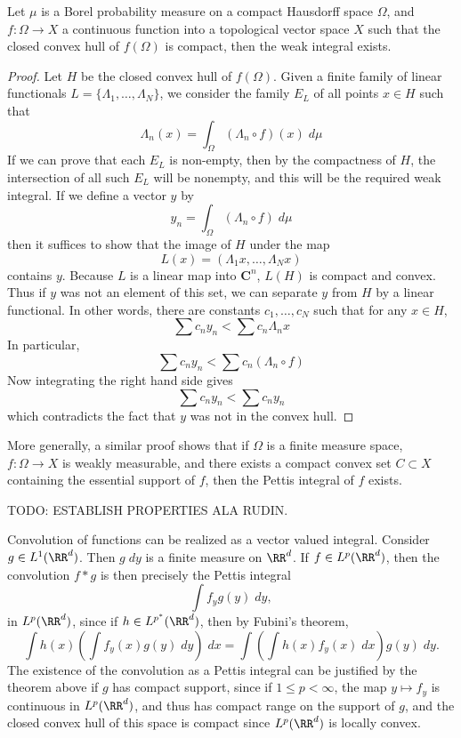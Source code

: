 \begin{theorem}
    Let $\mu$ is a Borel probability measure on a compact Hausdorff space $\Omega$, and $f: \Omega \to X$ a continuous function into a topological vector space $X$ such that the closed convex hull of $f(\Omega)$ is compact, then the weak integral exists.
\end{theorem}
\begin{proof}
    Let $H$ be the closed convex hull of $f(\Omega)$. Given a finite family of linear functionals $L = \{ \Lambda_1, \dots, \Lambda_N \}$, we consider the family $E_L$ of all points $x \in H$ such that
    \[ \Lambda_n(x) = \int_\Omega (\Lambda_n \circ f)(x)\; d\mu \]
    If we can prove that each $E_L$ is non-empty, then by the compactness of $H$, the intersection of all such $E_L$ will be nonempty, and this will be the required weak integral. If we define a vector $y$ by
    \[ y_n = \int_\Omega (\Lambda_n \circ f)\; d\mu \]
    then it suffices to show that the image of $H$ under the map
    \[ L(x) = (\Lambda_1 x, \dots, \Lambda_N x) \]
    contains $y$. Because $L$ is a linear map into $\mathbf{C}^n$, $L(H)$ is compact and convex. Thus if $y$ was not an element of this set, we can separate $y$ from $H$ by a linear functional. In other words, there are constants $c_1, \dots, c_N$ such that for any $x \in H$,
    \[ \sum c_n y_n < \sum c_n \Lambda_n x \]
    In particular,
    \[ \sum c_n y_n < \sum c_n (\Lambda_n \circ f) \]
    Now integrating the right hand side gives
    \[ \sum c_n y_n < \sum c_n y_n \]
    which contradicts the fact that $y$ was not in the convex hull.
\end{proof}

More generally, a similar proof shows that if $\Omega$ is a finite measure space, $f: \Omega \to X$ is weakly measurable, and there exists a compact convex set $C \subset X$ containing the essential support of $f$, then the Pettis integral of $f$ exists.

TODO: ESTABLISH PROPERTIES ALA RUDIN.

\begin{example}
    Convolution of functions can be realized as a vector valued integral. Consider $g \in L^1(\RR^d)$. Then $g\; dy$ is a finite measure on $\RR^d$. If $f \in L^p(\RR^d)$, then the convolution $f * g$ is then precisely the Pettis integral
    \[ \int f_y g(y)\; dy, \]
    in $L^p(\RR^d)$, since if $h \in L^{p^*}(\RR^d)$, then by Fubini's theorem,
    \[ \int h(x) \left( \int f_y(x) g(y)\; dy \right)\; dx = \int \left( \int h(x) f_y(x)\; dx \right) g(y)\; dy. \]
    The existence of the convolution as a Pettis integral can be justified by the theorem above if $g$ has compact support, since if $1 \leq p < \infty$, the map $y \mapsto f_y$ is continuous in $L^p(\RR^d)$, and thus has compact range on the support of $g$, and the closed convex hull of this space is compact since $L^p(\RR^d)$ is locally convex.
\end{example}

